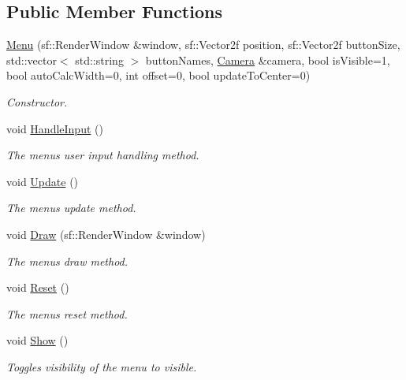 \subsection*{Public Member Functions}
\begin{DoxyCompactItemize}
\item 
\hyperlink{class_menu_accc796ef85a8a1834ebf5cd04db2334c}{Menu} (sf\+::\+Render\+Window \&window, sf\+::\+Vector2f position, sf\+::\+Vector2f button\+Size, std\+::vector$<$ std\+::string $>$ button\+Names, \hyperlink{class_camera}{Camera} \&camera, bool is\+Visible=1, bool auto\+Calc\+Width=0, int offset=0, bool update\+To\+Center=0)
\begin{DoxyCompactList}\small\item\em Constructor. \end{DoxyCompactList}\item 
void \hyperlink{class_menu_a0cb3596524ed7fd021f999860b563bf8}{Handle\+Input} ()
\begin{DoxyCompactList}\small\item\em The menu\textquotesingle{}s user input handling method. \end{DoxyCompactList}\item 
void \hyperlink{class_menu_af29d71473a414e31e914bc637840cb3e}{Update} ()
\begin{DoxyCompactList}\small\item\em The menu\textquotesingle{}s update method. \end{DoxyCompactList}\item 
void \hyperlink{class_menu_a9052b7f20dcf6d9ed47d87f16fcfe5e9}{Draw} (sf\+::\+Render\+Window \&window)
\begin{DoxyCompactList}\small\item\em The menu\textquotesingle{}s draw method. \end{DoxyCompactList}\item 
void \hyperlink{class_menu_af48862906748cee615d455eae4ee3349}{Reset} ()
\begin{DoxyCompactList}\small\item\em The menu\textquotesingle{}s reset method. \end{DoxyCompactList}\item 
void \hyperlink{class_menu_a03141d21380b6c72be54edd7aae33ff4}{Show} ()
\begin{DoxyCompactList}\small\item\em Toggles visibility of the menu to visible. \end{DoxyCompactList}\item 

\end{DoxyCompactItemize}
